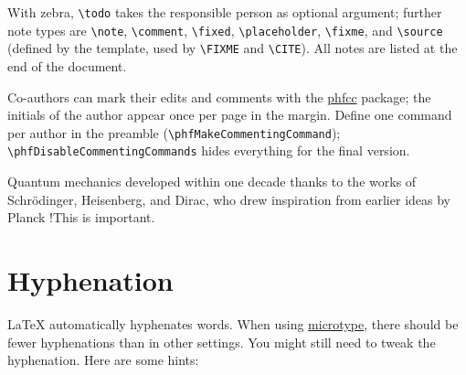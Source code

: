 \documentclass[../thesis-example-en]{subfiles}
\begin{document}
With zebra, \verb|\todo| takes the responsible person as optional argument; further note types are \verb|\note|, \verb|\comment|, \verb|\fixed|, \verb|\placeholder|, \verb|\fixme|, and \verb|\source| (defined by the template, used by \verb|\FIXME| and \verb|\CITE|).
All notes are listed at the end of the document.

\begin{ltgexample}




\end{ltgexample}


Co-authors can mark their edits and comments with the \href{https://ctan.org/pkg/phfcc}{phfcc} package; the initials of the author appear once per page in the margin.
Define one command per author in the preamble (\verb|\phfMakeCommentingCommand|); \verb|\phfDisableCommentingCommands| hides everything for the final version.

\begin{ltgexample}
Quantum mechanics developed within one decade thanks to the works of Schrödinger, Heisenberg, and Dirac,
who drew inspiration from earlier ideas by Planck  
 \FA!{This is important.}
\end{ltgexample}

\section{Hyphenation}

\LaTeX{} automatically hyphenates words.
When using \href{https://ctan.org/pkg/microtype}{microtype}, there should be fewer hyphenations than in other settings.
You might still need to tweak the hyphenation.
Here are some hints:

\end{document}
